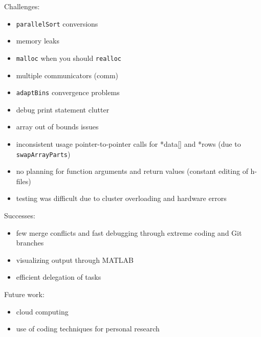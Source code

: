 \documentclass{article}
\begin{document}
\medskip

\begin{minipage}{\linewidth}
\begin{mdframed}[backgroundcolor=red!20]
	Challenges:
	\begin{itemize}
		\item \texttt{parallelSort} conversions
		\item memory leaks
		\item \texttt{malloc} when you should \texttt{realloc}
		\item multiple communicators (comm)
		\item \texttt{adaptBins} convergence problems
		\item debug print statement clutter
		\item array out of bounds issues
		\item inconsistent usage pointer-to-pointer calls for *data[] and *rows (due to \texttt{swapArrayParts})
		\item no planning for function arguments and return values (constant editing of h-files)
		\item testing was difficult due to cluster overloading and hardware errors
	\end{itemize}
\end{mdframed}
\end{minipage}

\medskip

\begin{minipage}{\linewidth}
\begin{mdframed}[backgroundcolor=green!20]
	Successes:
	\begin{itemize}
		\item few merge conflicts and fast debugging through extreme coding and Git branches
		\item visualizing output through MATLAB
		\item efficient delegation of tasks
	\end{itemize}
\end{mdframed}
\end{minipage}

\medskip

\begin{minipage}{\linewidth}
\begin{mdframed}[backgroundcolor=blue!20]
	Future work:
	\begin{itemize}
		\item cloud computing
		\item use of coding techniques for personal research
	\end{itemize}
\end{mdframed}
\end{minipage}
\end{document}
